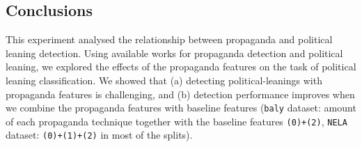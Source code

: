 

\subsection{Conclusions}
\label{ssec:ps_prop_leaning_classifier_conclusion}

This experiment analysed the relationship between propaganda and political leaning detection. Using available works for propaganda detection and political leaning, we explored the effects of the propaganda features on the task of political leaning classification. We showed that %
(a) detecting political-leanings with propaganda features is challenging, and (b) detection performance improves when we combine the propaganda features with baseline features (\texttt{baly} dataset: amount of each propaganda technique together with the baseline features \texttt{(0)+(2)}, \texttt{NELA} dataset: \texttt{(0)+(1)+(2)} in most of the splits).


